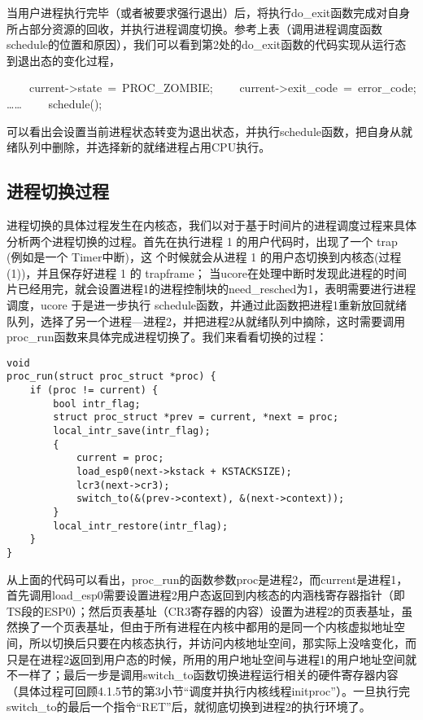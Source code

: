 当用户进程执行完毕（或者被要求强行退出）后，将执行do\_exit函数完成对自身所占部分资源的回收，并执行进程调度切换。参考上表（调用进程调度函数schedule的位置和原因），我们可以看到第2处的do\_exit函数的代码实现从运行态到退出态的变化过程，

~~~~current-\textgreater{}state~=~PROC\_ZOMBIE;
~~~~current-\textgreater{}exit\_code~=~error\_code; \ldots{}\ldots{}
~~~~schedule();

可以看出会设置当前进程状态转变为退出状态，并执行schedule函数，把自身从就绪队列中删除，并选择新的就绪进程占用CPU执行。

\subsection{进程切换过程}\label{ux8fdbux7a0bux5207ux6362ux8fc7ux7a0b}

进程切换的具体过程发生在内核态，我们以对于基于时间片的进程调度过程来具体分析两个进程切换的过程。首先在执行进程
1 的用户代码时，出现了一个 trap (例如是一个 Timer中断)，这
个时候就会从进程 1 的用户态切换到内核态(过程(1))，并且保存好进程 1 的
trapframe；
当ucore在处理中断时发现此进程的时间片已经用完，就会设置进程1的进程控制块的need\_resched为1，表明需要进行进程调度，ucore
于是进一步执行
schedule函数，并通过此函数把进程1重新放回就绪队列，选择了另一个进程---进程2，并把进程2从就绪队列中摘除，这时需要调用proc\_run函数来具体完成进程切换了。我们来看看切换的过程：

\begin{lstlisting}
void
proc_run(struct proc_struct *proc) {
    if (proc != current) {
        bool intr_flag;
        struct proc_struct *prev = current, *next = proc;
        local_intr_save(intr_flag);
        {
            current = proc;
            load_esp0(next->kstack + KSTACKSIZE);
            lcr3(next->cr3);
            switch_to(&(prev->context), &(next->context));
        }
        local_intr_restore(intr_flag);
    }
}
\end{lstlisting}

从上面的代码可以看出，proc\_run的函数参数proc是进程2，而current是进程1，首先调用load\_esp0需要设置进程2用户态返回到内核态的内涵栈寄存器指针（即TS段的ESP0）；然后页表基址（CR3寄存器的内容）设置为进程2的页表基址，虽然换了一个页表基址，但由于所有进程在内核中都用的是同一个内核虚拟地址空间，所以切换后只要在内核态执行，并访问内核地址空间，那实际上没啥变化，而只是在进程2返回到用户态的时候，所用的用户地址空间与进程1的用户地址空间就不一样了；最后一步是调用switch\_to函数切换进程运行相关的硬件寄存器内容（具体过程可回顾4.1.5节的第3小节``调度并执行内核线程initproc''）。一旦执行完switch\_to的最后一个指令``RET''后，就彻底切换到进程2的执行环境了。

